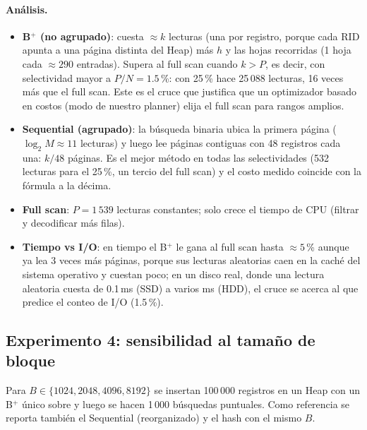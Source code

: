 \paragraph{Análisis.}
\begin{itemize}
\item \textbf{B$^+$ (no agrupado)}: cuesta $\approx k$ lecturas (una por registro, porque cada RID apunta
  a una página distinta del Heap) más $h$ y las hojas recorridas (1 hoja cada $\approx 290$ entradas).
  Supera al full scan cuando $k > P$, es decir, con selectividad mayor a $P/N = 1.5$\,\%: con 25\,\%
  hace 25\,088 lecturas, 16 veces más que el full scan. Este es el cruce que justifica que un
  optimizador basado en costos (modo  de nuestro planner) elija el full scan para rangos
  amplios.
\item \textbf{Sequential (agrupado)}: la búsqueda binaria ubica la primera página ($\log_2 M\approx 11$
  lecturas) y luego lee páginas contiguas con 48 registros cada una: $k/48$ páginas. Es el mejor método en
  todas las selectividades (532 lecturas para el 25\,\%, un tercio del full scan) y el costo medido
  coincide con la fórmula a la décima.
\item \textbf{Full scan}: $P=1\,539$ lecturas constantes; solo crece el tiempo de CPU (filtrar y
  decodificar más filas).
\item \textbf{Tiempo vs I/O}: en tiempo el B$^+$ le gana al full scan hasta $\approx 5$\,\% aunque ya lea
  3 veces más páginas, porque sus lecturas aleatorias caen en la caché del sistema operativo y cuestan
  poco; en un disco real, donde una lectura aleatoria cuesta de 0.1\,ms (SSD) a varios ms (HDD), el cruce
  se acerca al que predice el conteo de I/O (1.5\,\%).
\end{itemize}

\subsection{Experimento 4: sensibilidad al tamaño de bloque}

Para $B\in\{1024, 2048, 4096, 8192\}$ se insertan 100\,000 registros en un Heap con un B$^+$ único sobre
 y luego se hacen 1\,000 búsquedas puntuales. Como referencia se reporta también el Sequential
(reorganizado) y el hash con el mismo $B$.

\begin{table}[H]
\centering\small

\caption{Experimento 4: efecto del tamaño de página ($N=100\,000$). La altura teórica es el intervalo
entre nodos llenos y nodos al 50\,\%.}
\label{tab:exp4}
\end{table}

